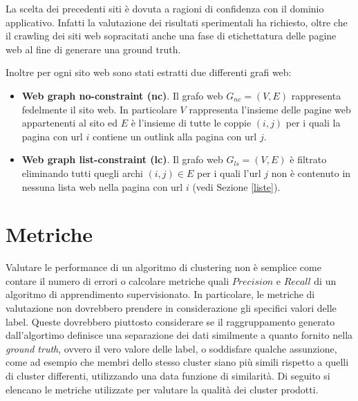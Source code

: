 La scelta dei precedenti siti è dovuta a ragioni di confidenza con il dominio applicativo. Infatti la valutazione dei risultati sperimentali ha richiesto, oltre che il crawling dei siti web sopracitati anche una fase di etichettatura delle pagine web al fine di generare una ground truth.

Inoltre per ogni sito web sono stati estratti due differenti grafi web:
\begin{itemize}
\item \textbf{Web graph no-constraint (nc)}. Il grafo web $G_{nc}=(V,E)$ rappresenta fedelmente il sito web. In particolare $V$ rappresenta l'insieme delle pagine web appartenenti al sito ed $E$ è l'insieme di tutte le coppie $(i,j)$ per i quali la pagina con url $i$ contiene un outlink alla pagina con url $j$.
\item \textbf{Web graph list-constraint (lc)}. Il grafo web $G_{ls}=(V,E)$ è filtrato eliminando tutti quegli archi $(i,j) \in E$ per i quali l'url $j$ non è contenuto in nessuna lista web nella pagina con url $i$ (vedi Sezione \ref{liste}).
\end{itemize}



\section{Metriche}
Valutare le performance di un algoritmo di clustering non è semplice come contare il numero di errori o calcolare metriche quali $Precision$ e $Recall$ di un algoritmo di apprendimento supervisionato. In particolare, le metriche di valutazione non dovrebbero prendere in considerazione gli specifici valori delle label. Queste dovrebbero piuttosto considerare se il raggruppamento generato dall'algortimo definisce una separazione dei dati similmente a quanto fornito nella \textit{ground truth}, ovvero il vero valore delle label, o soddisfare qualche assunzione, come ad esempio che membri dello stesso cluster siano più simili rispetto a quelli di cluster differenti, utilizzando una data funzione di similarità. Di seguito si elencano le metriche utilizzate per valutare la qualità dei cluster prodotti.

